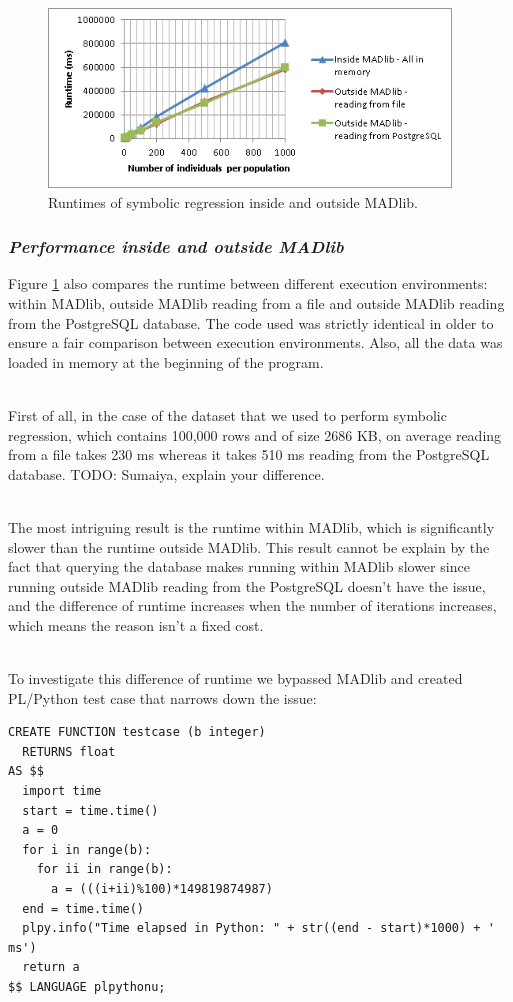 \begin{figure}[ht]
\centering
\includegraphics[height=180px]{gp-inside-vs-outside.png}
\caption{Runtimes of symbolic regression inside and outside MADlib.}
\label{fig:gp-inside-vs-outside}
\end{figure}

\subsubsection*{\itshape Performance inside and outside MADlib}
Figure \ref{fig:gp-inside-vs-outside} also compares the runtime between different execution environments: within MADlib, outside MADlib reading from a file and outside MADlib reading from the PostgreSQL database. The code used was strictly identical in older to ensure a fair comparison between execution environments. Also, all the data was loaded in memory at the beginning of the program.

~~\\
First of all, in the case of the dataset that we used to perform symbolic regression, which contains 100,000 rows and of size 2686 KB, on average reading from a file takes 230 ms whereas it takes 510 ms reading from the PostgreSQL database. TODO: Sumaiya, explain your difference.

~~\\
The most intriguing result is the runtime within MADlib, which is significantly slower than the runtime outside MADlib. This result cannot be explain by the fact that querying the database makes running within MADlib slower since running outside MADlib reading from the PostgreSQL doesn't have the issue, and the difference of runtime increases when the number of iterations increases, which means the reason isn't a fixed cost.

~~\\
To investigate this difference of runtime we bypassed MADlib and created PL/Python test case that narrows down the issue:

\begin{verbatim}
CREATE FUNCTION testcase (b integer)
  RETURNS float
AS $$
  import time
  start = time.time()
  a = 0
  for i in range(b):
    for ii in range(b):
      a = (((i+ii)%100)*149819874987)
  end = time.time()
  plpy.info("Time elapsed in Python: " + str((end - start)*1000) + ' ms')
  return a
$$ LANGUAGE plpythonu;
\end{verbatim}

